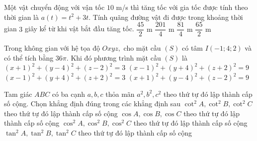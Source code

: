 \begin{ex}%
Một vật chuyển động với vận tốc $ 10 $ m/s thì tăng tốc với gia tốc được tính theo thời gian là $ a(t)=t^2+3t. $ Tính quãng đường vật đi được trong khoảng thời gian $ 3 $ giây kể từ khi vật bắt đầu tăng tốc.
\choice
{$ \dfrac{45}{2} $ m}
{\True $ \dfrac{201}{4} $ m}
{$ \dfrac{81}{4} $ m}
{$ \dfrac{65}{2} $ m}
\end{ex}

\begin{ex}%
Trong không gian với hệ tọa độ $ Oxyz, $ cho mặt cầu $ (S) $ có tâm $ I(-1;4;2) $  và có thể tích bằng $ 36\pi.  $ Khi đó phương trình mặt cầu $ (S) $ là
\choice
{$ (x+1)^2+(y-4)^2+(z-2)^2=3 $}
{$ (x-1)^2+(y+4)^2+(z+2)^2=9 $}
{$ (x-1)^2+(y+4)^2+(z+2)^2=3 $}
{\True $ (x+1)^2+(y-4)^2+(z-2)^2=9 $}
\end{ex}

\begin{ex}%
Tam giác $ ABC $ có ba cạnh $ a, b, c $ thỏa mãn $ a^2, b^2, c^2 $ theo thứ tự đó lập thành cấp số cộng. Chọn khẳng
định đúng trong các khẳng định sau
\choice
{$\cot^2A, \cot^2B,\cot^2C  $ theo thứ tự đó lập thành cấp số cộng}
{$\cos A, \cos B,\cos C  $ theo thứ tự đó lập thành cấp số cộng}
{\True $\cos^2 A, \cos^2 B,\cos^2 C  $ theo thứ tự đó lập thành cấp số cộng}
{$\tan^2A, \tan^2B,\tan^2C  $ theo thứ tự đó lập thành cấp số cộng}
\end{ex}

